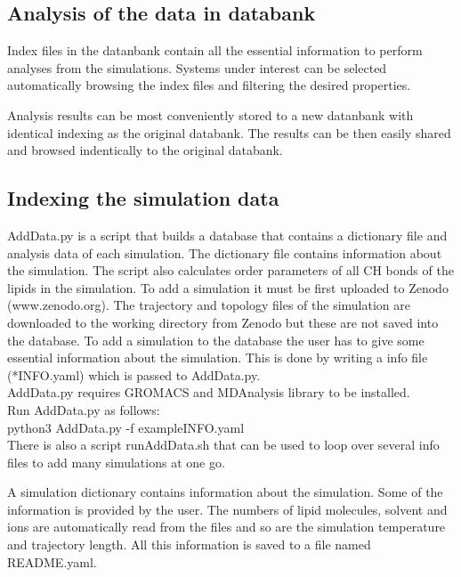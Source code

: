 \documentclass[fleqn,10pt]{wlscirep}
\begin{document}
\subsection{Analysis of the data in databank}

Index files in the datanbank contain all the essential information to perform analyses from the simulations. Systems under interest can be selected automatically browsing the index files and filtering the desired properties. 

Analysis results can be most conveniently stored to a new datanbank with identical indexing as the original databank. The results can be then easily shared and browsed indentically to the original databank.

\subsection{Indexing the simulation data}

AddData.py is a script that builds a database that contains a dictionary file and analysis data of each simulation. The dictionary file contains information about the simulation. The script also calculates order parameters of all CH bonds of the lipids in the simulation. To add a simulation it must be first uploaded to Zenodo (www.zenodo.org). The trajectory and topology files of the simulation are downloaded to the working directory from Zenodo but these are not saved into the database. To add a simulation to the database the user has to give some essential information about the simulation. This is done by writing a info file (*INFO.yaml) which is passed to AddData.py. 
\newline \\
AddData.py requires GROMACS and MDAnalysis library to be installed.
\newline \\
Run AddData.py as follows:
\newline \\
python3 AddData.py -f exampleINFO.yaml
\newline \\
There is also a script runAddData.sh that can be used to loop over several info files to add many simulations at one go.

A simulation dictionary contains information about the simulation. Some of the information is provided by the user. The numbers of lipid molecules, solvent and ions are automatically read from the files and so are the simulation temperature and trajectory length. All this information is saved to a file named README.yaml.
\end{document}
